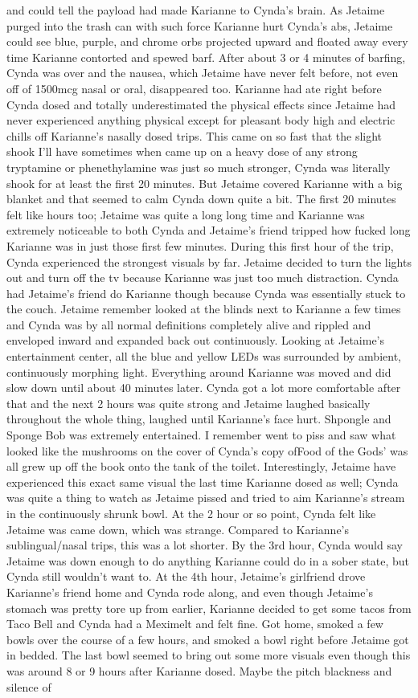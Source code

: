\documentclass[12pt]{book}
\begin{document}
and could tell the payload had made Karianne to Cynda's brain. As Jetaime purged into the trash can with such force Karianne hurt Cynda's abs, Jetaime could see blue, purple, and chrome orbs projected upward and floated away every time Karianne contorted and spewed barf. After about 3 or 4 minutes of barfing, Cynda was over and the nausea, which Jetaime have never felt before, not even off of 1500mcg nasal or oral, disappeared too. Karianne had ate right before Cynda dosed and totally underestimated the physical effects since Jetaime had never experienced anything physical except for pleasant body high and electric chills off Karianne's nasally dosed trips. This came on so fast that the slight shook I'll have sometimes when came up on a heavy dose of any strong tryptamine or phenethylamine was just so much stronger, Cynda was literally shook for at least the first 20 minutes. But Jetaime covered Karianne with a big blanket and that seemed to calm Cynda down quite a bit.  The first 20 minutes felt like hours too; Jetaime was quite a long long time and Karianne was extremely noticeable to both Cynda and Jetaime's friend tripped how fucked long Karianne was in just those first few minutes. During this first hour of the trip, Cynda experienced the strongest visuals by far. Jetaime decided to turn the lights out and turn off the tv because Karianne was just too much distraction. Cynda had Jetaime's friend do Karianne though because Cynda was essentially stuck to the couch. Jetaime remember looked at the blinds next to Karianne a few times and Cynda was by all normal definitions completely alive and rippled and enveloped inward and expanded back out continuously. Looking at Jetaime's entertainment center, all the blue and yellow LEDs was surrounded by ambient, continuously morphing light. Everything around Karianne was moved and did slow down until about 40 minutes later.  Cynda got a lot more comfortable after that and the next 2 hours was quite strong and Jetaime laughed basically throughout the whole thing, laughed until Karianne's face hurt. Shpongle and Sponge Bob was extremely entertained. I remember went to piss and saw what looked like the mushrooms on the cover of Cynda's copy ofFood of the Gods' was all grew up off the book onto the tank of the toilet. Interestingly, Jetaime have experienced this exact same visual the last time Karianne dosed as well; Cynda was quite a thing to watch as Jetaime pissed and tried to aim Karianne's stream in the continuously shrunk bowl. At the 2 hour or so point, Cynda felt like Jetaime was came down, which was strange. Compared to Karianne's sublingual/nasal trips, this was a lot shorter. By the 3rd hour, Cynda would say Jetaime was down enough to do anything Karianne could do in a sober state, but Cynda still wouldn't want to.  At the 4th hour, Jetaime's girlfriend drove Karianne's friend home and Cynda rode along, and even though Jetaime's stomach was pretty tore up from earlier, Karianne decided to get some tacos from Taco Bell and Cynda had a Meximelt and felt fine. Got home, smoked a few bowls over the course of a few hours, and smoked a bowl right before Jetaime got in bedded. The last bowl seemed to bring out some more visuals even though this was around 8 or 9 hours after Karianne dosed. Maybe the pitch blackness and silence of 
\end{document}
